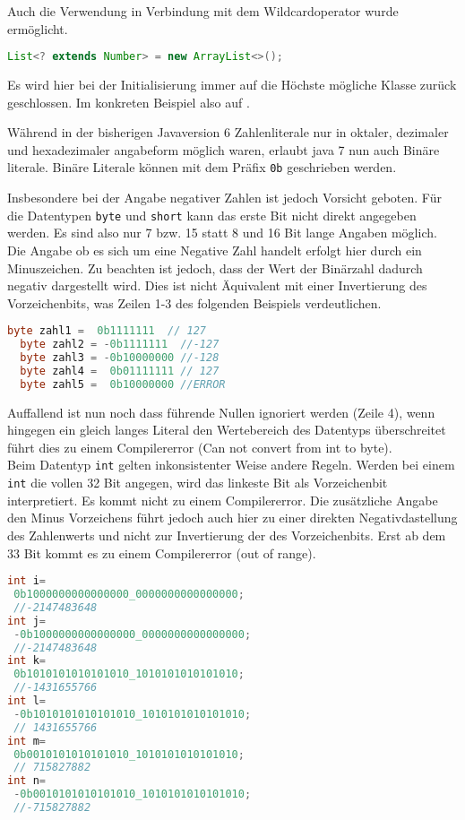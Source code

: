 \documentclass[times, 10pt,twocolumn]{article}
\begin{document}
Auch die Verwendung in Verbindung mit dem Wildcardoperator wurde ermöglicht.
\begin{lstlisting}[language=java,breaklines=true]
  List<? extends Number> = new ArrayList<>();
\end{lstlisting}
Es wird hier bei der Initialisierung immer auf die Höchste mögliche Klasse zurück geschlossen. Im konkreten Beispiel also auf .\cite{v2bJava7}



Während in der bisherigen Javaversion 6 Zahlenliterale nur in oktaler, dezimaler und hexadezimaler angabeform möglich waren, erlaubt java 7 nun auch Binäre literale. Binäre Literale können mit dem Präfix \texttt{0b} geschrieben werden.

Insbesondere bei der Angabe negativer Zahlen ist jedoch Vorsicht geboten. Für die Datentypen \texttt{byte} und \texttt{short} kann das erste Bit nicht direkt angegeben werden. Es sind also nur 7 bzw. 15 statt 8 und 16 Bit lange Angaben möglich. Die Angabe ob es sich um eine Negative Zahl handelt erfolgt hier durch ein Minuszeichen. Zu beachten ist jedoch, dass der Wert der Binärzahl dadurch negativ dargestellt wird. Dies ist nicht Äquivalent mit einer Invertierung des Vorzeichenbits, was Zeilen 1-3 des folgenden Beispiels verdeutlichen.\cite{sbJ7literals}
\begin{lstlisting}[language=java,breaklines=true]
  byte zahl1 =  0b1111111  // 127
  byte zahl2 = -0b1111111  //-127
  byte zahl3 = -0b10000000 //-128
  byte zahl4 =  0b01111111 // 127
  byte zahl5 =  0b10000000 //ERROR
\end{lstlisting}
Auffallend ist nun noch dass führende Nullen ignoriert werden (Zeile 4), wenn hingegen ein gleich langes Literal den Wertebereich des Datentyps überschreitet führt dies zu einem Compilererror (Can not convert from int to byte)\cite{sbJ7literals}.\\

Beim Datentyp \texttt{int} gelten inkonsistenter Weise andere Regeln. Werden bei einem \texttt{int} die vollen 32 Bit angegen, wird das linkeste Bit als Vorzeichenbit interpretiert. Es kommt nicht zu einem Compilererror. Die zusätzliche Angabe den Minus Vorzeichens führt jedoch auch hier zu einer direkten Negativdastellung des Zahlenwerts und nicht zur Invertierung der des Vorzeichenbits. Erst ab dem 33 Bit kommt es zu einem Compilererror (out of range).
\begin{lstlisting}[language=java,breaklines=true]
int i=
 0b1000000000000000_0000000000000000;
 //-2147483648
int j=
 -0b1000000000000000_0000000000000000;
 //-2147483648
int k=
 0b1010101010101010_1010101010101010;
 //-1431655766
int l=
 -0b1010101010101010_1010101010101010;
 // 1431655766
int m=
 0b0010101010101010_1010101010101010;
 // 715827882
int n=
 -0b0010101010101010_1010101010101010;
 //-715827882
\end{lstlisting}
\end{document}
